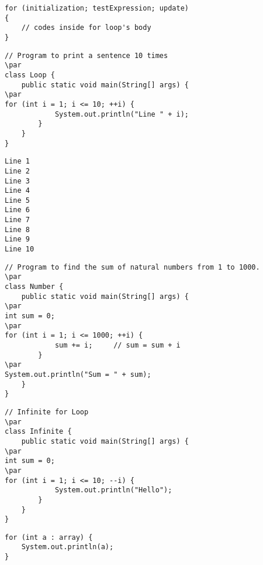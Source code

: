 \documentclass{book}
\def\lthtmlcheckvsize{\ifdim\ht\sizebox<\vsize 
  \ifdim\wd\sizebox<\hsize\expandafter\hfill\fi \expandafter\vfill
  \else\expandafter\vss\fi}%
\begin{document}
{\newpage\clearpage
{}%
\begin{lstlisting}
for (initialization; testExpression; update)
{
    // codes inside for loop's body
}
\end{lstlisting}%
\lthtmlfigureZ
\lthtmlcheckvsize\clearpage}

{\newpage\clearpage
{}%
\begin{lstlisting}
// Program to print a sentence 10 times
\par
class Loop {
    public static void main(String[] args) {
\par
for (int i = 1; i <= 10; ++i) {
            System.out.println("Line " + i);
        }
    }
}
\end{lstlisting}%
\lthtmlfigureZ
\lthtmlcheckvsize\clearpage}

{\newpage\clearpage
{}%
\begin{lstlisting}
Line 1
Line 2
Line 3
Line 4
Line 5
Line 6
Line 7
Line 8
Line 9
Line 10
\end{lstlisting}%
\lthtmlfigureZ
\lthtmlcheckvsize\clearpage}

{\newpage\clearpage
{}%
\begin{lstlisting}
// Program to find the sum of natural numbers from 1 to 1000.
\par
class Number {
    public static void main(String[] args) {
\par
int sum = 0;
\par
for (int i = 1; i <= 1000; ++i) {
            sum += i;     // sum = sum + i
        }
\par
System.out.println("Sum = " + sum);
    }
}
\end{lstlisting}%
\lthtmlfigureZ
\lthtmlcheckvsize\clearpage}

{\newpage\clearpage
{}%
\begin{lstlisting}
// Infinite for Loop
\par
class Infinite {
    public static void main(String[] args) {
\par
int sum = 0;
\par
for (int i = 1; i <= 10; --i) {
            System.out.println("Hello");
        }
    }
}
\end{lstlisting}%
\lthtmlfigureZ
\lthtmlcheckvsize\clearpage}

{\newpage\clearpage
{}%
\begin{lstlisting}
for (int a : array) {
    System.out.println(a);
}
\end{lstlisting}%
\lthtmlfigureZ
\lthtmlcheckvsize\clearpage}
\end{document}
